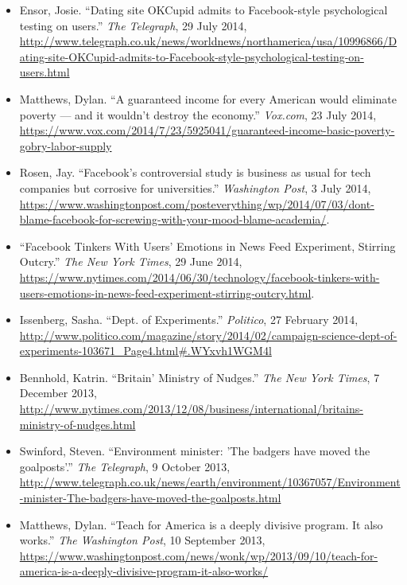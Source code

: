 \documentclass[12pt,a4paper]{article}
\begin{document}
\begin{itemize}
\item Ensor, Josie. ``Dating site OKCupid admits to Facebook-style psychological testing on users.'' \textit{The Telegraph}, 29 July 2014,  \url{http://www.telegraph.co.uk/news/worldnews/northamerica/usa/10996866/Dating-site-OKCupid-admits-to-Facebook-style-psychological-testing-on-users.html}

\item Matthews, Dylan. ``A guaranteed income for every American would eliminate poverty — and it wouldn't destroy the economy.'' \textit{Vox.com}, 23 July 2014, \url{https://www.vox.com/2014/7/23/5925041/guaranteed-income-basic-poverty-gobry-labor-supply}

\item Rosen, Jay. ``Facebook's controversial study is business as usual for tech companies but corrosive for universities.'' \textit{Washington Post}, 3 July 2014, \url{https://www.washingtonpost.com/posteverything/wp/2014/07/03/dont-blame-facebook-for-screwing-with-your-mood-blame-academia/}.

\item ``Facebook Tinkers With Users' Emotions in News Feed Experiment, Stirring Outcry.'' \textit{The New York Times}, 29 June 2014, \url{https://www.nytimes.com/2014/06/30/technology/facebook-tinkers-with-users-emotions-in-news-feed-experiment-stirring-outcry.html}.

\item Issenberg, Sasha. ``Dept. of Experiments.'' \textit{Politico}, 27 February 2014, \url{http://www.politico.com/magazine/story/2014/02/campaign-science-dept-of-experiments-103671_Page4.html#.WYxvh1WGM4l}

\item Bennhold, Katrin. ``Britain' Ministry of Nudges.'' \textit{The New York Times}, 7 December 2013, \url{http://www.nytimes.com/2013/12/08/business/international/britains-ministry-of-nudges.html}

\item Swinford, Steven. ``Environment minister: 'The badgers have moved the goalposts'.'' \textit{The Telegraph}, 9 October 2013, \url{http://www.telegraph.co.uk/news/earth/environment/10367057/Environment-minister-The-badgers-have-moved-the-goalposts.html}

\item Matthews, Dylan. ``Teach for America is a deeply divisive program. It also works.'' \textit{The Washington Post}, 10 September 2013, \url{https://www.washingtonpost.com/news/wonk/wp/2013/09/10/teach-for-america-is-a-deeply-divisive-program-it-also-works/}


\end{itemize}
\end{document}
